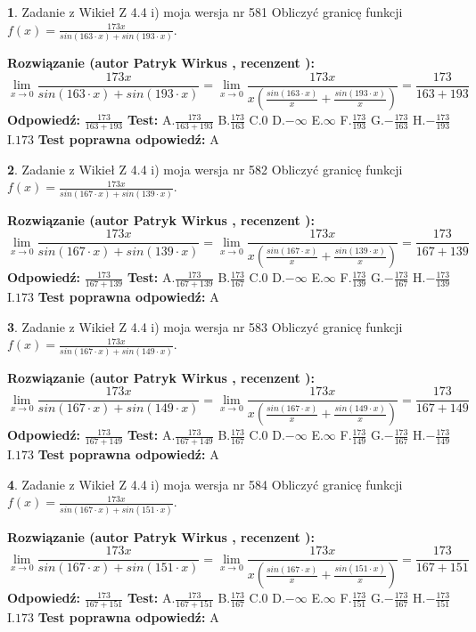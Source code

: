\documentclass[12pt, a4paper]{article}
\theoremstyle{definition} %
\newtheorem{zad}{}
\newcommand{\zadStart}[1]{\begin{zad}#1\newline}
\newcommand{\zadStop}{\end{zad}}
\newcommand{\rozwStart}[2]{\noindent \textbf{Rozwiązanie (autor #1 , recenzent #2): }\newline}
\newcommand{\rozwStop}{\newline}
\newcommand{\odpStart}{\noindent \textbf{Odpowiedź:}\newline}
\newcommand{\odpStop}{\newline}
\newcommand{\testStart}{\noindent \textbf{Test:}\newline}
\newcommand{\testStop}{\newline}
\newcommand{\kluczStart}{\noindent \textbf{Test poprawna odpowiedź:}\newline}
\newcommand{\kluczStop}{\newline}
\begin{document}
\zadStart{Zadanie z Wikieł Z 4.4 i) moja wersja nr 581}
Obliczyć granicę funkcji $f(x)=\frac{173x}{sin(163\cdot x) +sin(193\cdot x)}$.
\zadStop
\rozwStart{Patryk Wirkus}{}
$$\lim\limits_{x\to 0}\frac{173x}{sin(163\cdot x) +sin(193\cdot x)}=\lim\limits_{x\to 0}\frac{173x}{x(\frac{sin(163\cdot x)}{x}+\frac{sin(193\cdot x)}{x})}=\frac{173}{163+193}$$
\rozwStop
\odpStart
$\frac{173}{163+193}$
\odpStop
\testStart
A.$\frac{173}{163+193}$
B.$\frac{173}{163}$
C.$0$
D.$-\infty$
E.$\infty$
F.$\frac{173}{193}$
G.$-\frac{173}{163}$
H.$-\frac{173}{193}$
I.$173$
\testStop
\kluczStart
A
\kluczStop



\zadStart{Zadanie z Wikieł Z 4.4 i) moja wersja nr 582}
Obliczyć granicę funkcji $f(x)=\frac{173x}{sin(167\cdot x) +sin(139\cdot x)}$.
\zadStop
\rozwStart{Patryk Wirkus}{}
$$\lim\limits_{x\to 0}\frac{173x}{sin(167\cdot x) +sin(139\cdot x)}=\lim\limits_{x\to 0}\frac{173x}{x(\frac{sin(167\cdot x)}{x}+\frac{sin(139\cdot x)}{x})}=\frac{173}{167+139}$$
\rozwStop
\odpStart
$\frac{173}{167+139}$
\odpStop
\testStart
A.$\frac{173}{167+139}$
B.$\frac{173}{167}$
C.$0$
D.$-\infty$
E.$\infty$
F.$\frac{173}{139}$
G.$-\frac{173}{167}$
H.$-\frac{173}{139}$
I.$173$
\testStop
\kluczStart
A
\kluczStop



\zadStart{Zadanie z Wikieł Z 4.4 i) moja wersja nr 583}
Obliczyć granicę funkcji $f(x)=\frac{173x}{sin(167\cdot x) +sin(149\cdot x)}$.
\zadStop
\rozwStart{Patryk Wirkus}{}
$$\lim\limits_{x\to 0}\frac{173x}{sin(167\cdot x) +sin(149\cdot x)}=\lim\limits_{x\to 0}\frac{173x}{x(\frac{sin(167\cdot x)}{x}+\frac{sin(149\cdot x)}{x})}=\frac{173}{167+149}$$
\rozwStop
\odpStart
$\frac{173}{167+149}$
\odpStop
\testStart
A.$\frac{173}{167+149}$
B.$\frac{173}{167}$
C.$0$
D.$-\infty$
E.$\infty$
F.$\frac{173}{149}$
G.$-\frac{173}{167}$
H.$-\frac{173}{149}$
I.$173$
\testStop
\kluczStart
A
\kluczStop



\zadStart{Zadanie z Wikieł Z 4.4 i) moja wersja nr 584}
Obliczyć granicę funkcji $f(x)=\frac{173x}{sin(167\cdot x) +sin(151\cdot x)}$.
\zadStop
\rozwStart{Patryk Wirkus}{}
$$\lim\limits_{x\to 0}\frac{173x}{sin(167\cdot x) +sin(151\cdot x)}=\lim\limits_{x\to 0}\frac{173x}{x(\frac{sin(167\cdot x)}{x}+\frac{sin(151\cdot x)}{x})}=\frac{173}{167+151}$$
\rozwStop
\odpStart
$\frac{173}{167+151}$
\odpStop
\testStart
A.$\frac{173}{167+151}$
B.$\frac{173}{167}$
C.$0$
D.$-\infty$
E.$\infty$
F.$\frac{173}{151}$
G.$-\frac{173}{167}$
H.$-\frac{173}{151}$
I.$173$
\testStop
\kluczStart
A
\kluczStop
\end{document}
